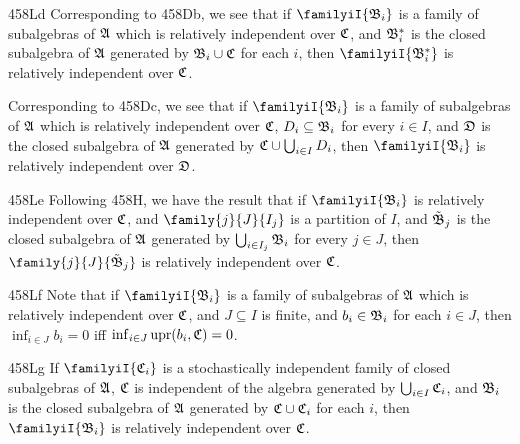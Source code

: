 \spheader 458Ld
Corresponding to 458Db, we see that if $\familyiI{\frak B_i}$ is a
family of subalgebras of $\frak A$  which is relatively independent over
$\frak C$, and $\frak B_i^*$ is the closed subalgebra of $\frak A$
generated by $\frak B_i\cup\frak C$ for each $i$, then
$\familyiI{\frak B_i^*}$ is relatively independent over $\frak C$.

Corresponding to 458Dc, we see that if $\familyiI{\frak B_i}$ is a family
of subalgebras of $\frak A$ which is relatively independent over $\frak C$,
$D_i\subseteq\frak B_i$ for every $i\in I$, and $\frak D$ is the closed
subalgebra of $\frak A$ generated by $\frak C\cup\bigcup_{i\in I}D_i$, then
$\familyiI{\frak B_i}$ is relatively independent over $\frak D$.

\spheader 458Le Following 458H, we have the result that if
$\familyiI{\frak B_i}$ is relatively independent over $\frak C$, and
$\family{j}{J}{I_j}$ is a partition of $I$, and $\tilde{\frak B}_j$ is
the closed subalgebra of $\frak A$ generated by
$\bigcup_{i\in I_j}\frak B_i$ for every $j\in J$, then
$\family{j}{J}{\tilde{\frak B}_j}$ is relatively independent over
$\frak C$.

\spheader 458Lf Note that if
$\familyiI{\frak B_i}$ is a family of subalgebras of $\frak A$ which is
relatively independent over $\frak C$, and $J\subseteq I$ is finite, and
$b_i\in\frak B_i$ for each $i\in J$, then $\inf_{i\in J}b_i=0$ iff
$\inf_{i\in J}\mathop{\text{upr}}(b_i,\frak C)=0$.   

\spheader 458Lg   If $\familyiI{\frak C_i}$
is a stochastically independent family of closed subalgebras of
$\frak A$, $\frak C$ is independent of
the algebra generated by $\bigcup_{i\in I}\frak C_i$, and $\frak B_i$ is
the closed subalgebra of $\frak A$ generated by $\frak C\cup\frak C_i$
for each $i$, then $\familyiI{\frak B_i}$ is relatively independent over
$\frak C$.   

